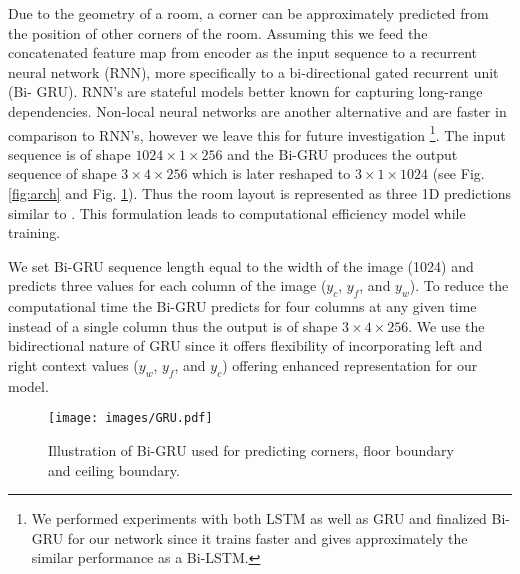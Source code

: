 \documentclass[final]{cvpr}
\begin{document}
Due to the geometry of a room, a corner can be approximately predicted from the position of other corners of the room. Assuming this we feed the concatenated feature map from encoder as the input sequence to a recurrent neural network (RNN), more specifically to a bi-directional gated recurrent unit (Bi- GRU). RNN's are stateful models better known for capturing long-range dependencies. Non-local neural networks \cite{rao2019non,wang2018non} are another alternative and are faster in comparison to RNN's, however we leave this for future investigation \footnote{We performed experiments with both LSTM \cite{hochreiter1997long} as well as GRU \cite{chung2014empirical} and finalized Bi-GRU for our network since it trains faster and gives approximately the similar performance as a Bi-LSTM.}. The input sequence is of shape $1024 \times 1 \times 256$ and the Bi-GRU produces the output sequence of shape $3 \times 4 \times 256$ which is later reshaped to $3 \times 1 \times 1024$ (see Fig. \ref{fig:arch} and Fig. \ref{fig:gru}). Thus the room layout is represented as three 1D predictions similar to \cite{sun2019horizonnet}. This formulation leads to computational efficiency model while training.


We set Bi-GRU sequence length equal to the width of the image (1024) and predicts three values for each column of the image ($y_c$, $y_f$, and $y_w$). To reduce the computational time the Bi-GRU predicts for four columns at any given time instead of a single column thus the output is of shape $3 \times 4 \times 256$. We use the bidirectional nature of GRU since it offers flexibility of incorporating left and right context values ($y_w$, $y_f$, and $y_c$) offering enhanced representation for our model.



\begin{figure}[!t]
    \centering
    \texttt{[image: images/GRU.pdf]}
    \caption{Illustration of Bi-GRU used for predicting corners, floor boundary and ceiling boundary.}
    \label{fig:gru}
\end{figure}
\end{document}
